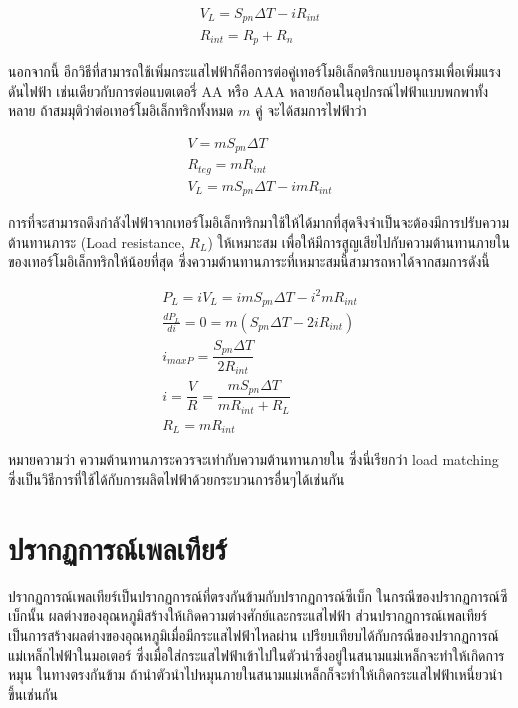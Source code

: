 \documentclass[a4paper,nobib,openany,10pt]{tufte-book}
\begin{document}
\[\begin{gathered}
  V_L = S_{pn}\Delta T - iR_{int} \\
  R_{int} = R_p + R_n\end{gathered}\]

นอกจากนี้ อีกวิธีที่สามารถใช้เพิ่มกระแสไฟฟ้าก็คือการต่อคู่เทอร์โมอิเล็กตริกแบบอนุกรมเพื่อเพิ่มแรงดันไฟฟ้า เช่นเดียวกับการต่อแบตเตอรี่ AA หรือ AAA หลายก้อนในอุปกรณ์ไฟฟ้าแบบพกพาทั้งหลาย ถ้าสมมุติว่าต่อเทอร์โมอิเล็กทริกทั้งหมด \(m\) คู่ จะได้สมการไฟฟ้าว่า

\[\begin{gathered}
  V = m S_{pn} \Delta T \\
  R_{teg} = m R_{int} \\
  V_L = m S_{pn} \Delta T - i mR_{int}\end{gathered}\]

การที่จะสามารถดึงกำลังไฟฟ้าจากเทอร์โมอิเล็กทริกมาใช้ให้ได้มากที่สุดจึงจำเป็นจะต้องมีการปรับความต้านทานภาระ (Load resistance, \(R_L\)) ให้เหมาะสม เพื่อให้มีการสูญเสียไปกับความต้านทานภายในของเทอร์โมอิเล็กทริกให้น้อยที่สุด ซึ่งความต้านทานภาระที่เหมาะสมนี้สามารถหาได้จากสมการดังนี้

\[\begin{gathered}
  P_L = iV_L = i m S_{pn} \Delta T - i^2 m R_{int} \\
  \frac{d P_L}{d i } = 0 = m(S_{pn} \Delta T - 2 i R_{int}) \\
  i_{max P} = \dfrac{S_{pn} \Delta T}{2 R_{int}} \\
  i = \dfrac{V}{R} = \dfrac{ m S_{pn} \Delta T }{ m R_{int} + R_L } \\
  R_L = m R_{int}\end{gathered}\]

หมายความว่า ความต้านทานภาระควรจะเท่ากับความต้านทานภายใน ซึ่งนี่เรียกว่า
load matching
ซึ่งเป็นวิธีการที่ใช้ได้กับการผลิตไฟฟ้าด้วยกระบวนการอื่นๆได้เช่นกัน

\section{ปรากฏการณ์เพลเทียร์}
\label{sec:org12c63dc}
ปรากฏการณ์เพลเทียร์เป็นปรากฏการณ์ที่ตรงกันข้ามกับปรากฏการณ์ซีเบ็ก  ในกรณีของปรากฏการณ์ซีเบ็กนั้น ผลต่างของอุณหภูมิสร้างให้เกิดความต่างศักย์และกระแสไฟฟ้า ส่วนปรากฏการณ์เพลเทียร์เป็นการสร้างผลต่างของอุณหภูมิเมื่อมีกระแสไฟฟ้าไหลผ่าน เปรียบเทียบได้กับกรณีของปรากฏการณ์แม่เหล็กไฟฟ้าในมอเตอร์ ซึ่งเมื่อใส่กระแสไฟฟ้าเข้าไปในตัวนำซึ่งอยู่ในสนามแม่เหล็กจะทำให้เกิดการหมุน ในทางตรงกันข้าม ถ้านำตัวนำไปหมุนภายในสนามแม่เหล็กก็จะทำให้เกิดกระแสไฟฟ้าเหนี่ยวนำขึ้นเช่นกัน
\end{document}

